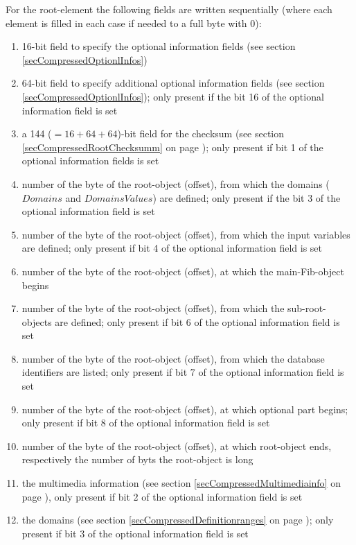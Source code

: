 \bigskip\noindent
For the root-element the following fields are written sequentially (where each element is filled in each case if needed to a full byte with $0$):
\begin{enumerate}
 \item 16-bit field to specify the optional information fields (see section \ref{secCompressedOptionlInfos})
 \item 64-bit field to specify additional optional information fields (see section \ref{secCompressedOptionlInfos}); only present if the bit 16 of the optional information field is set
 \item a 144 ($= 16 +64 +64$)-bit field for the checksum (see section \ref{secCompressedRootChecksumm} on page \pageref{secCompressedRootChecksumm}); only present if bit 1 of the optional information fields is set
 \item number of the byte of the root-object (offset), from which the domains ($Domains$ and $DomainsValues$) are defined; only present if the bit 3 of the optional information field is set
 \item number of the byte of the root-object (offset), from which the input variables are defined; only present if bit 4 of the optional information field is set
 \item number of the byte of the root-object (offset), at which the main-Fib-object begins
 \item number of the byte of the root-object (offset), from which the sub-root-objects are defined; only present if bit 6 of the optional information field is set
 \item number of the byte of the root-object (offset), from which the database identifiers are listed; only present if bit 7 of the optional information field is set
 \item number of the byte of the root-object (offset), at which optional part begins; only present if bit 8 of the optional information field is set
 \item number of the byte of the root-object (offset), at which root-object ends, respectively the number of byts the root-object is long
 \item the multimedia information (see section \ref{secCompressedMultimediainfo} on page \pageref{secCompressedMultimediainfo}), only present if bit 2 of the optional information field is set
 \item the domains (see section \ref{secCompressedDefinitionranges} on page \pageref{secCompressedDefinitionranges}); only present if bit 3 of the optional information field is set

\end{enumerate}
